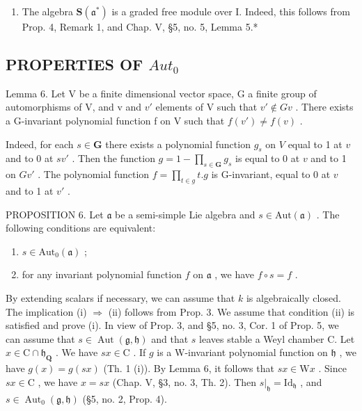 \begin{enumerate}
\def\labelenumi{\arabic{enumi})}
\setcounter{enumi}{1}
\tightlist
\item
  The algebra \(\mathbf{S}(\mathfrak{a}^*)\) is a graded free module over I. Indeed, this follows from Prop. 4, Remark 1, and Chap. V, §5, no. 5, Lemma 5.*
\end{enumerate}

\subsection{\texorpdfstring{PROPERTIES OF \(Aut_{0}\)}{PROPERTIES OF Aut\_\{0\}}}

Lemma 6. Let V be a finite dimensional vector space, G a finite group of automorphisms of V, and v and \(v'\) elements of V such that \(v' \notin Gv\) . There exists a G-invariant polynomial function f on V such that \(f(v') \neq f(v)\) .

Indeed, for each \(s \in \mathbf{G}\) there exists a polynomial function \(g_{s}\) on \(V\) equal to 1 at \(v\) and to 0 at \(sv'\) . Then the function \(g = 1 - \prod_{s \in \mathbf{G}} g_{s}\) is equal to 0 at \(v\) and to 1 on \(Gv'\) . The polynomial function \(f = \prod_{t \in g} t.g\) is G-invariant, equal to 0 at \(v\) and to 1 at \(v'\) .

PROPOSITION 6. Let \(\mathfrak{a}\) be a semi-simple Lie algebra and \(s\in \mathrm{Aut}(\mathfrak{a})\) . The following conditions are equivalent:

\begin{enumerate}
\def\labelenumi{(\roman{enumi})}
\item
  \(s \in \text{Aut}_{0}(\mathfrak{a})\) ;
\item
  for any invariant polynomial function \(f\) on \(\mathfrak{a}\) , we have \(f \circ s = f\) .
\end{enumerate}

By extending scalars if necessary, we can assume that \(k\) is algebraically closed. The implication (i) \(\Longrightarrow\) (ii) follows from Prop. 3. We assume that condition (ii) is satisfied and prove (i). In view of Prop. 3, and §5, no. 3, Cor. 1 of Prop. 5, we can assume that \(s \in \operatorname{Aut}(\mathfrak{g}, \mathfrak{h})\) and that \(s\) leaves stable a Weyl chamber C. Let \(x \in \mathrm{C} \cap \mathfrak{h}_{\mathbf{Q}}\) . We have \(sx \in \mathrm{C}\) . If \(g\) is a W-invariant polynomial function on \(\mathfrak{h}\) , we have \(g(x) = g(sx)\) (Th. 1 (i)). By Lemma 6, it follows that \(sx \in \mathrm{W}x\) . Since \(sx \in \mathrm{C}\) , we have \(x = sx\) (Chap. V, §3, no. 3, Th. 2). Then \(s|_{\mathfrak{h}} = \mathrm{Id}_{\mathfrak{h}}\) , and \(s \in \operatorname{Aut}_0(\mathfrak{g}, \mathfrak{h})\) (§5, no. 2, Prop. 4).

